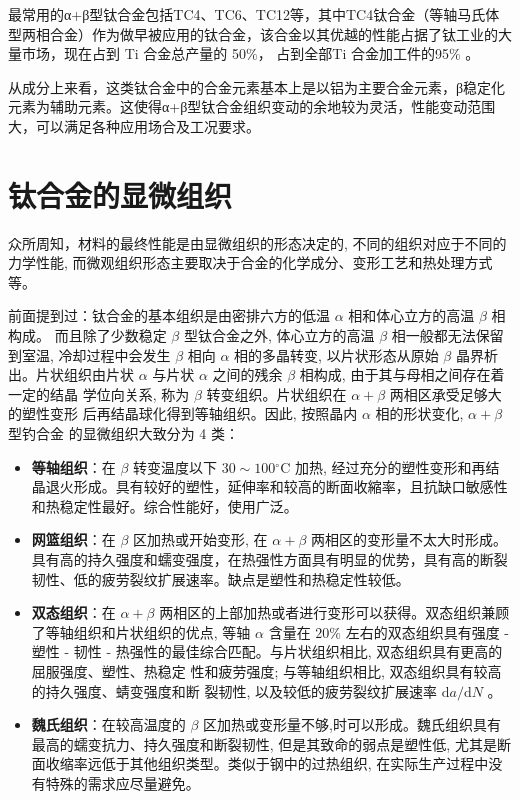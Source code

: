 最常用的α+β型钛合金包括TC4、TC6、TC12等，其中TC4钛合金（等轴马氏体型两相合金）作为做早被应用的钛合金，该合金以其优越的性能占据了钛工业的大量市场，现在占到 Ti 合金总产量的 50$ \%  $， 占到全部Ti 合金加工件的95$ \% $ 。

从成分上来看，这类钛合金中的合金元素基本上是以铝为主要合金元素，β稳定化元素为辅助元素。这使得α+β型钛合金组织变动的余地较为灵活，性能变动范围大，可以满足各种应用场合及工况要求\cite{TiandAl}。
\section{钛合金的显微组织}
众所周知，材料的最终性能是由显微组织的形态决定的, 不同的组织对应于不同的力学性能, 而微观组织形态主要取决于合金的化学成分、变形工艺和热处理方式等。

前面提到过：钛合金的基本组织是由密排六方的低温 $\alpha$ 相和体心立方的高温 $\beta$ 相构成。 而且除了少数稳定 $\beta$ 型钛合金之外, 体心立方的高温 $\beta$ 相一般都无法保留到室温, 冷却过程中会发生 $\beta$ 相向 $\alpha$ 相的多晶转变, 以片状形态从原始 $\beta$ 晶界析出。片状组织由片状 $\alpha$ 与片状 $\alpha$ 之间的残余 $\beta$ 相构成, 由于其与母相之间存在着一定的结晶 学位向关系, 称为 $\beta$ 转变组织。片状组织在 $\alpha+\beta$ 两相区承受足够大的塑性变形 后再结晶球化得到等轴组织。因此, 按照晶内 $\alpha$ 相的形状变化, $\alpha+\beta$ 型钓合金 的显微组织大致分为 4 类：

\begin{itemize}
	\item 	\textbf{等轴组织}：在 $\beta$ 转变温度以下 $30 \sim 100{ }^{\circ} \mathrm{C}$ 加热, 经过充分的塑性变形和再结晶退火形成。具有较好的塑性，延伸率和较高的断面收縮率，且抗缺口敏感性和热稳定性最好。综合性能好，使用广泛。
	\item 	\textbf{网篮组织}：在 $\beta$ 区加热或开始变形, 在 $\alpha+\beta$ 两相区的变形量不太大时形成。具有高的持久强度和蠕变强度，在热强性方面具有明显的优势，具有高的断裂韧性、低的疲劳裂纹扩展速率。缺点是塑性和热稳定性较低。
	\item 	\textbf{双态组织}：在 $\alpha+\beta$ 两相区的上部加热或者进行变形可以获得。双态组织兼顾了等轴组织和片状组织的优点, 等轴 $\alpha$ 含量在 $20 \%$ 左右的双态组织具有强度 - 塑性 - 韧性 - 热强性的最佳综合匹配。与片状组织相比, 双态组织具有更高的屈服强度、塑性、热稳定 性和疲劳强度; 与等轴组织相比, 双态组织具有较高的持久强度、蜻变强度和断 裂韧性, 以及较低的疲劳裂纹扩展速率 $\mathrm{d} a / \mathrm{d} N$ 。
	\item 	\textbf{魏氏组织}：在较高温度的 $\beta$ 区加热或变形量不够,时可以形成。魏氏组织具有最高的蠕变抗力、持久强度和断裂韧性, 但是其致命的弱点是塑性低, 尤其是断面收缩率远低于其他组织类型。类似于钢中的过热组织, 在实际生产过程中没有特殊的需求应尽量避免。
\end{itemize}

